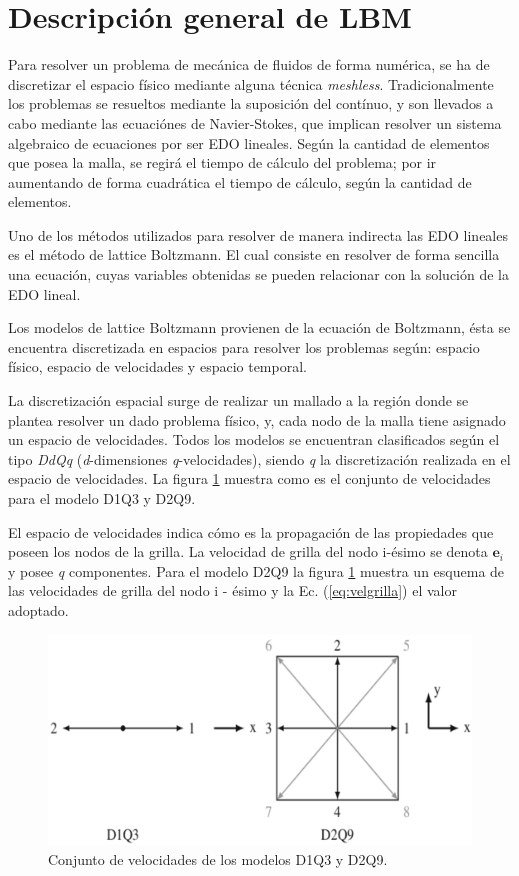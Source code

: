 \section{Descripción general de LBM}

Para resolver un problema de mecánica de fluidos de forma numérica, se ha de discretizar el espacio físico mediante alguna técnica \textit{meshless}. Tradicionalmente los problemas se resueltos mediante la suposición del contínuo, y son llevados a cabo mediante las ecuaciónes de Navier-Stokes, que implican resolver un sistema algebraico de ecuaciones por ser EDO lineales. Según la cantidad de elementos que posea la malla, se regirá el tiempo de cálculo del problema; por ir aumentando de forma cuadrática el tiempo de cálculo, según la cantidad de elementos.

Uno de los métodos utilizados para resolver de manera indirecta las EDO lineales es el método de lattice Boltzmann. El cual consiste en resolver de forma sencilla una ecuación, cuyas variables obtenidas se pueden relacionar con la solución de la EDO lineal.

Los modelos de lattice Boltzmann provienen de la ecuación de Boltzmann, ésta se encuentra discretizada en espacios para resolver los problemas según: espacio físico, espacio de velocidades y espacio temporal. 

La discretización espacial surge de realizar un mallado a la región donde se plantea resolver un dado problema físico, y, cada nodo de la malla tiene asignado un espacio de velocidades. Todos los modelos se encuentran clasificados según el tipo \textit{DdQq} (\textit{d}-dimensiones  \textit{q}-velocidades), siendo \textit{q} la discretización realizada en el espacio de velocidades. La figura \ref{fig:D1Q3_D2Q9} muestra como es el conjunto de velocidades para el modelo D1Q3 y D2Q9.

El espacio de velocidades indica cómo es la propagación de las propiedades que poseen los nodos de la grilla. La velocidad de grilla del nodo i-ésimo se denota $\mathbf{e}_{i}$ y posee \textit{q} componentes. Para el modelo D2Q9 la figura \ref{fig:D1Q3_D2Q9} muestra un esquema de las velocidades de grilla del nodo i - ésimo y la Ec. (\ref{eq:velgrilla}) el valor adoptado.

\begin{figure}[h!]
	\centering
	\includegraphics[width=.8\textwidth]{figs/cap1/D1Q3_D2Q9}
	\caption{Conjunto de velocidades de los modelos D1Q3 y D2Q9. \cite{kruger2017lattice}}
	\label{fig:D1Q3_D2Q9}	
\end{figure}


